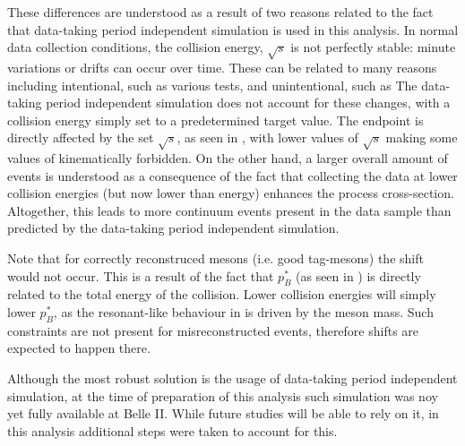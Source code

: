 These differences are understood as a result of two reasons related to the fact that data-taking period independent simulation is used in this analysis.
In normal data collection conditions, the collision energy, $\sqrt{s}$ is not perfectly stable: minute variations or drifts can occur over time.
These can be related to many reasons including intentional, such as various tests, and unintentional, such as 
The data-taking period independent simulation does not account for these changes, with a collision energy simply set to a predetermined target value.
The \Mbc endpoint is directly affected by the set $\sqrt{s}$, as seen in , with lower values of $\sqrt{s}$ making some values of \Mbc kinematically forbidden.
On the other hand, a larger overall amount of \qqbar events is understood as a consequence of the fact that collecting the data at lower collision energies (but now lower than \FourS energy) enhances the \epem\ra\qqbar process cross-section.
Altogether, this leads to more continuum events present in the data sample than predicted by the data-taking period independent simulation.

Note that for correctly reconstruced \B mesons (i.e. good tag-\B mesons) the shift would not occur.
This is a result of the fact that $p_B^*$ (as seen in ) is directly related to the total energy of the collision.
Lower collision energies will simply lower $p_B^*$, as the resonant-like behaviour in \Mbc is driven by the \B meson mass.
Such constraints are not present for misreconstructed events, therefore shifts are expected to happen there.

Although the most robust solution is the usage of data-taking period independent simulation, at the time of preparation of this analysis such simulation was noy yet fully available at Belle II.
While future studies will be able to rely on it, in this analysis additional steps were taken to account for this.

